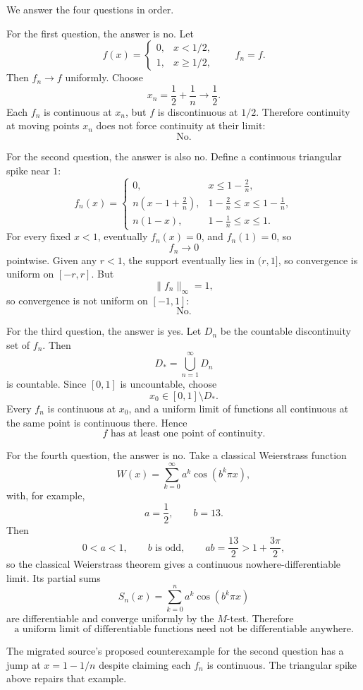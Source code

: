 \begin{solution}
We answer the four questions in order.

For the first question, the answer is no. Let
\[
f(x)
=
\begin{cases}
0,&x<1/2,\\
1,&x\ge1/2,
\end{cases}
\qquad
f_n=f.
\]
Then \(f_n\to f\) uniformly. Choose
\[
x_n=\frac12+\frac1n\to\frac12.
\]
Each \(f_n\) is continuous at \(x_n\), but \(f\) is discontinuous at \(1/2\). Therefore
continuity at moving points \(x_n\) does not force continuity at their limit:
\[
\boxed{\text{No}.}
\]

For the second question, the answer is also no. Define a continuous triangular spike near
\(1\):
\[
f_n(x)
=
\begin{cases}
0,&x\le1-\frac2n,\\[2mm]
n\left(x-1+\frac2n\right),
&
1-\frac2n\le x\le1-\frac1n,\\[2mm]
n(1-x),
&
1-\frac1n\le x\le1.
\end{cases}
\]
For every fixed \(x<1\), eventually \(f_n(x)=0\), and \(f_n(1)=0\), so
\[
f_n\to0
\]
pointwise. Given any \(r<1\), the support eventually lies in \((r,1]\), so convergence is
uniform on \([-r,r]\). But
\[
\|f_n\|_\infty=1,
\]
so convergence is not uniform on \([-1,1]\):
\[
\boxed{\text{No}.}
\]

For the third question, the answer is yes. Let \(D_n\) be the countable discontinuity set of
\(f_n\). Then
\[
D_*=\bigcup_{n=1}^{\infty}D_n
\]
is countable. Since \([0,1]\) is uncountable, choose
\[
x_0\in[0,1]\setminus D_*.
\]
Every \(f_n\) is continuous at \(x_0\), and a uniform limit of functions all continuous at the
same point is continuous there. Hence
\[
\boxed{f\text{ has at least one point of continuity}.}
\]

For the fourth question, the answer is no. Take a classical Weierstrass function
\[
W(x)
=
\sum_{k=0}^{\infty}
a^k\cos(b^k\pi x),
\]
with, for example,
\[
a=\frac12,
\qquad
b=13.
\]
Then
\[
0<a<1,\qquad b\text{ is odd},\qquad
ab=\frac{13}{2}>1+\frac{3\pi}{2},
\]
so the classical Weierstrass theorem gives a continuous nowhere-differentiable limit. Its
partial sums
\[
S_n(x)
=
\sum_{k=0}^{n}
a^k\cos(b^k\pi x)
\]
are differentiable and converge uniformly by the \(M\)-test. Therefore
\[
\boxed{
\text{a uniform limit of differentiable functions need not be differentiable anywhere}.
}
\]

The migrated source's proposed counterexample for the second question has a jump at
\(x=1-1/n\) despite claiming each \(f_n\) is continuous. The triangular spike above repairs
that example.
\end{solution}


